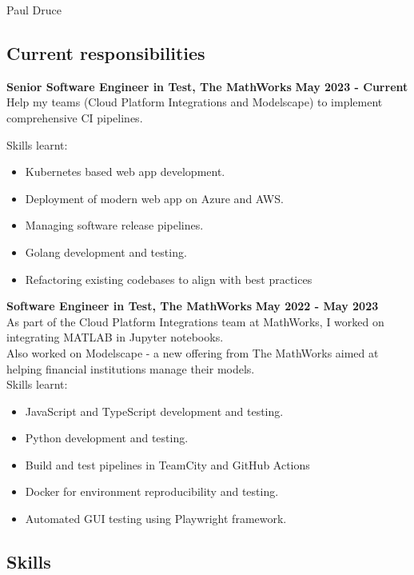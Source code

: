 \documentclass[10pt]{article}
\def\name{Paul Druce}
\providecommand{\tightlist}{%
  \setlength{\itemsep}{0pt}\setlength{\parskip}{0pt}}
\begin{document}
{\huge \name}

\subsection{Current responsibilities}\label{current-responsibilities}

\textbf{Senior Software Engineer in Test, The MathWorks}
\hfill \textbf{May 2023 - Current} \\
Help my teams (Cloud Platform Integrations and Modelscape) to implement
comprehensive CI pipelines.

Skills learnt:

\begin{itemize}
\tightlist
\item
  Kubernetes based web app development.
\item
  Deployment of modern web app on Azure and AWS.
\item
  Managing software release pipelines.
\item
  Golang development and testing.
\item
  Refactoring existing codebases to align with best practices
\end{itemize}

\textbf{Software Engineer in Test, The MathWorks}
\hfill \textbf{May 2022 - May 2023} \\
As part of the Cloud Platform Integrations team at MathWorks, I worked
on integrating MATLAB in Jupyter notebooks.\\
Also worked on Modelscape - a new offering from The MathWorks aimed at
helping financial institutions manage their models.\\

Skills learnt:

\begin{itemize}
\tightlist
\item
  JavaScript and TypeScript development and testing.
\item
  Python development and testing.
\item
  Build and test pipelines in TeamCity and GitHub Actions
\item
  Docker for environment reproducibility and testing.
\item
  Automated GUI testing using Playwright framework.
\end{itemize}

\subsection{Skills}\label{skills}
\end{document}
